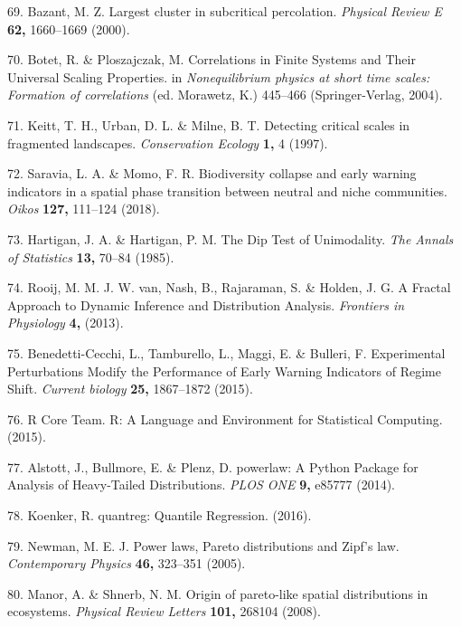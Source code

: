 \documentclass[]{article}
\begin{document}
\hypertarget{ref-Bazant2000}{}
69. Bazant, M. Z. Largest cluster in subcritical percolation.
\emph{Physical Review E} \textbf{62,} 1660--1669 (2000).

\hypertarget{ref-Botet2004}{}
70. Botet, R. \& Ploszajczak, M. Correlations in Finite Systems and
Their Universal Scaling Properties. in \emph{Nonequilibrium physics at
short time scales: Formation of correlations} (ed. Morawetz, K.)
445--466 (Springer-Verlag, 2004).

\hypertarget{ref-Keitt1997}{}
71. Keitt, T. H., Urban, D. L. \& Milne, B. T. Detecting critical scales
in fragmented landscapes. \emph{Conservation Ecology} \textbf{1,} 4
(1997).

\hypertarget{ref-Saravia2018}{}
72. Saravia, L. A. \& Momo, F. R. Biodiversity collapse and early
warning indicators in a spatial phase transition between neutral and
niche communities. \emph{Oikos} \textbf{127,} 111--124 (2018).

\hypertarget{ref-Hartigan1985}{}
73. Hartigan, J. A. \& Hartigan, P. M. The Dip Test of Unimodality.
\emph{The Annals of Statistics} \textbf{13,} 70--84 (1985).

\hypertarget{ref-VanRooij2013}{}
74. Rooij, M. M. J. W. van, Nash, B., Rajaraman, S. \& Holden, J. G. A
Fractal Approach to Dynamic Inference and Distribution Analysis.
\emph{Frontiers in Physiology} \textbf{4,} (2013).

\hypertarget{ref-Benedetti-Cecchi2015}{}
75. Benedetti-Cecchi, L., Tamburello, L., Maggi, E. \& Bulleri, F.
Experimental Perturbations Modify the Performance of Early Warning
Indicators of Regime Shift. \emph{Current biology} \textbf{25,}
1867--1872 (2015).

\hypertarget{ref-RCoreTeam2015}{}
76. R Core Team. R: A Language and Environment for Statistical
Computing. (2015).

\hypertarget{ref-Alstott2014}{}
77. Alstott, J., Bullmore, E. \& Plenz, D. powerlaw: A Python Package
for Analysis of Heavy-Tailed Distributions. \emph{PLOS ONE} \textbf{9,}
e85777 (2014).

\hypertarget{ref-Koenker2016}{}
78. Koenker, R. quantreg: Quantile Regression. (2016).

\hypertarget{ref-Newman2005}{}
79. Newman, M. E. J. Power laws, Pareto distributions and Zipf's law.
\emph{Contemporary Physics} \textbf{46,} 323--351 (2005).

\hypertarget{ref-Manor2008a}{}
80. Manor, A. \& Shnerb, N. M. Origin of pareto-like spatial
distributions in ecosystems. \emph{Physical Review Letters}
\textbf{101,} 268104 (2008).
\end{document}
